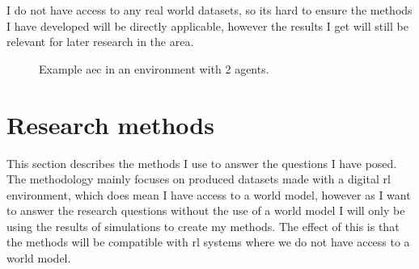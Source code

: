 \documentclass[UKenglish]{uiomasterthesis}
\begin{document}
I do not have access to any real world datasets, so its hard to ensure the methods I have developed will be directly applicable, however the results I get will still be relevant for later research in the area.
\begin{figure}[hbtp]
\centering
{}

\caption{Example \ac{aec} in an environment with 2 agents.}
\label{fig:aec}
\end{figure}

\section{Research methods}
\label{sec:research}
This section describes the methods I use to answer the questions I have posed. The methodology mainly focuses on produced datasets made with a digital \ac{rl} environment, which does mean I have access to a world model, however as I want to answer the research questions without the use of a world model I will only be using the results of simulations to create my methods. The effect of this is that the methods will be compatible with \ac{rl} systems where we do not have access to a world model.
\end{document}

